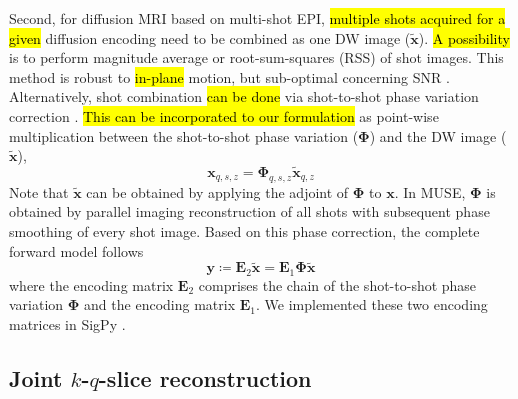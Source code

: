 \documentclass[preprint,12pt,authoryear,review]{elsarticle}
\begin{document}

    Second, for diffusion MRI based on multi-shot EPI,
    \hl{multiple shots acquired for a given} diffusion encoding
    need to be combined as one DW image ($\mathbf{\tilde{x}}$).
    \hl{A possibility} is to perform magnitude average \citep{chen_2013_muse}
    or root-sum-squares (RSS) \citep{mani_2017_mussels}
    of shot images.
    This method is robust to \hl{in-plane} motion, 
    but sub-optimal concerning SNR
    \citep{guhaniyogi_2016_amuse}.
    Alternatively, shot combination \hl{can be done} 
    via shot-to-shot phase variation correction
    \citep{liu_2005_moco_diff,chen_2013_muse}.
    \hl{This can be incorporated to our formulation} 
    as point-wise multiplication
    between the shot-to-shot phase variation ($\mathbf{\Phi}$) and
    the DW image ($\mathbf{\tilde{x}}$),
    \begin{equation}
         \mathbf{x}_{q,s,z} = \mathbf{\Phi}_{q,s,z} \mathbf{\tilde{x}}_{q,z}
    \end{equation}
    Note that $\mathbf{\tilde{x}}$ can be obtained
    by applying the adjoint of $\mathbf{\Phi}$ to $\mathbf{x}$.
    In MUSE, $\mathbf{\Phi}$ is obtained by parallel imaging reconstruction of all shots
    with subsequent phase smoothing of every shot image.
    Based on this phase correction, the complete forward model follows
    \begin{equation}
        \mathbf{y} \coloneqq \mathbf{E}_2 \mathbf{\tilde{x}} = \mathbf{E}_1 \mathbf{\Phi} \mathbf{\tilde{x}}
        \label{EQU:model_dwi}
    \end{equation}
    where the encoding matrix $\mathbf{E}_2$ comprises the chain of
    the shot-to-shot phase variation $\mathbf{\Phi}$ and
    the encoding matrix $\mathbf{E}_1$.
    We implemented these two encoding matrices in SigPy \citep{ong_2019_sigpy}.


    \subsection{Joint $k$-$q$-slice reconstruction}
    \label{SUBSEC:JETS}
\end{document}
